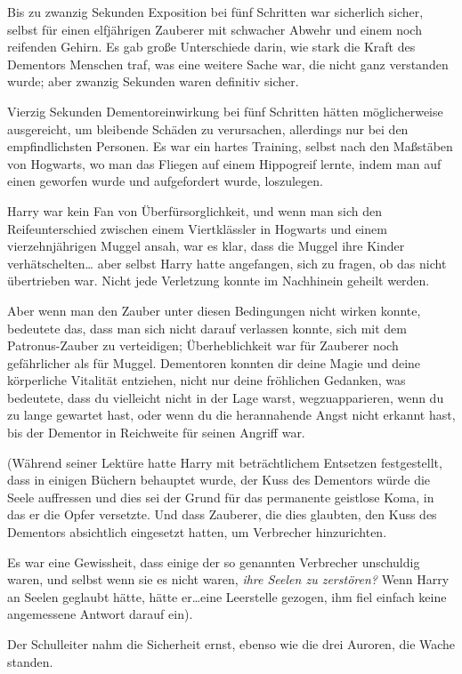 {Bis zu zwanzig Sekunden Exposition bei fünf Schritten war sicherlich sicher, selbst für einen elfjährigen Zauberer mit schwacher Abwehr und einem noch reifenden Gehirn. Es gab große Unterschiede darin, wie stark die Kraft des Dementors Menschen traf, was eine weitere Sache war, die nicht ganz verstanden wurde; aber zwanzig Sekunden waren definitiv sicher.

Vierzig Sekunden Dementoreinwirkung bei fünf Schritten hätten möglicherweise ausgereicht, um bleibende Schäden zu verursachen, allerdings nur bei den empfindlichsten Personen. Es war ein hartes Training, selbst nach den Maßstäben von Hogwarts, wo man das Fliegen auf einem Hippogreif lernte, indem man auf einen geworfen wurde und aufgefordert wurde, loszulegen.

Harry war kein Fan von Überfürsorglichkeit, und wenn man sich den Reifeunterschied zwischen einem Viertklässler in Hogwarts und einem vierzehnjährigen Muggel ansah, war es klar, dass die Muggel ihre Kinder verhätschelten… aber selbst Harry hatte angefangen, sich zu fragen, ob das nicht übertrieben war. Nicht jede Verletzung konnte im Nachhinein geheilt werden.

Aber wenn man den Zauber unter diesen Bedingungen nicht wirken konnte, bedeutete das, dass man sich nicht darauf verlassen konnte, sich mit dem Patronus-Zauber zu verteidigen; Überheblichkeit war für Zauberer noch gefährlicher als für Muggel. Dementoren konnten dir deine Magie und deine körperliche Vitalität entziehen, nicht nur deine fröhlichen Gedanken, was bedeutete, dass du vielleicht nicht in der Lage warst, wegzuapparieren, wenn du zu lange gewartet hast, oder wenn du die herannahende Angst nicht erkannt hast, bis der Dementor in Reichweite für seinen Angriff war.

(Während seiner Lektüre hatte Harry mit beträchtlichem Entsetzen festgestellt, dass in einigen Büchern behauptet wurde, der Kuss des Dementors würde die Seele auffressen und dies sei der Grund für das permanente geistlose Koma, in das er die Opfer versetzte. Und dass Zauberer, die dies glaubten, den Kuss des Dementors absichtlich eingesetzt hatten, um Verbrecher hinzurichten.

Es war eine Gewissheit, dass einige der so genannten Verbrecher unschuldig waren, und selbst wenn sie es nicht waren, \emph{ihre Seelen zu zerstören?} Wenn Harry an Seelen geglaubt hätte, hätte er…eine Leerstelle gezogen, ihm fiel einfach keine angemessene Antwort darauf ein).

Der Schulleiter nahm die Sicherheit ernst, ebenso wie die drei Auroren, die Wache standen.

}
